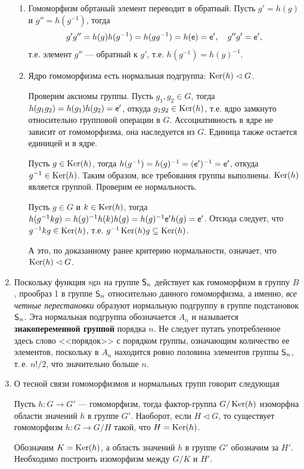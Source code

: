 \begin{enumerate}
\begin{enumerate}[\bf Hom1]
\item Гомоморфизм обртаный элемент переводит в обратный. Пусть $g'=h(g)$ и $g''=h(g^{-1})$, тогда
$$
g'g'' = h(g)h(g^{-1})=h(gg^{-1})=h(\mathsf e)=\mathsf e',\quad g''g'=\mathsf e',
$$
т.е. элемент $g''$ --- обратный к $g'$, т.е. $h(g^{-1})=h(g)^{-1}$.

\item Ядро гомоморфизма есть нормальная подгруппа: $\mathop{\mathrm{Ker}}(h)\vartriangleleft G$.

Проверим аксиомы группы. Пусть $g_1, g_2\in G$, тогда $h(g_1g_2)=h(g_1)h(g_2)=\mathsf e'$, откуда $g_1g_2\in\mathop{\mathrm{Ker}}(h)$, т.е. ядро замкнуто относительно групповой операции в $G$. Ассоциативность в ядре не зависит от гомоморфизма, она наследуется из $G$. Единица также остается единицей и в ядре.

Пусть $g\in\mathop{\mathrm{Ker}}(h)$, тогда $h(g^{-1})=h(g)^{-1}=(\mathsf e')^{-1}=\mathsf e'$, откуда $g^{-1}\in\mathop{\mathrm{Ker}}(h)$. Таким образом, все требования группы выполнены. $\mathop{\mathrm{Ker}}(h)$ является группой. Проверим ее нормальность.

Пусть $g\in G$ и $k\in\mathop{\mathrm{Ker}}(h)$, тогда $h(g^{-1}kg)=h(g)^{-1}h(k)h(g)=h(g)^{-1}\mathsf e'h(g)=\mathsf e'$. Отсюда следует, что $g^{-1}kg\in\mathop{\mathrm{Ker}}(h)$, т.е. $g^{-1}\mathop{\mathrm{Ker}}(h)g\subseteq \mathop{\mathrm{Ker}}(h)$.

А это, по доказанному ранее критерию нормальности, означает, что $\mathop{\mathrm{Ker}}(h)\vartriangleleft G$.

\end{enumerate}

\item Поскольку функция $\mathop{\mathrm{sgn}}$ на группе ${\mathsf{S}}_n$ действует как гомоморфизм в группу $B$, прообраз 1 в группе ${\mathsf{S}}_n$ относительно данного гомоморфизма, а именно, \textit{все четные перестановки} образуют нормальную подгруппу в группе подстановок ${\mathsf{S}}_n$. Эта нормальная подгруппа обозначается $A_n$ и называется \textbf{знакопеременной группой} порядка $n$. Не следует путать употребленное здесь слово <<порядок>> с порядком группы, означающим количество ее элементов, поскольку в $A_n$ находится ровно половина элементов группы ${\mathsf{S}}_n$, т.\,е. $n!/2$, что значительно больше $n$.

\item О тесной связи гомоморфизмов и нормальных групп говорит следующая

\begin{thrm}
Пусть $h:G\to G'$ --- гомоморфизм, тогда
фактор-группа $G/\mathop{\mathrm{Ker}}(h)$ изоморфна области значений $h$ в группе $G'$. Наоборот, если $H\vartriangleleft G$, то существует гомоморфизм $h:G\to G/H$ такой, что $H=\mathop{\mathrm{Ker}}(h)$.
\end{thrm}
\pf
Обозначим $K=\mathop{\mathrm{Ker}}(h)$, а область значений $h$ в группе $G'$ обозначим за $H'$. Необходимо построить изоморфизм между $G/K$ и $H'$.


\end{enumerate}
